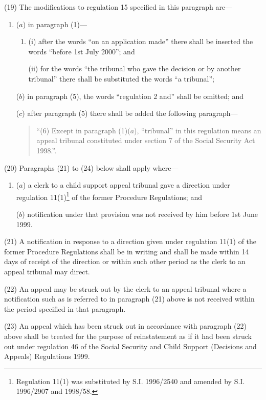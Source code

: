 \documentclass[12pt,a4paper]{article}
\begin{document}
(19) The modifications to regulation 15 specified in this paragraph are—
\begin{enumerate}\item[]
($a$) in paragraph (1)—
\begin{enumerate}\item[]
(i) after the words “on an application made” there shall be inserted the words “before 1st July 2000”; and

(ii) for the words “the tribunal who gave the decision or by another tribunal” there shall be substituted the words “a tribunal”;
\end{enumerate}

($b$) in paragraph (5), the words “regulation 2 and” shall be omitted; and

($c$) after paragraph (5) there shall be added the following paragraph—
\begin{quotation}
“(6) Except in paragraph (1)($a$), “tribunal” in this regulation means an appeal tribunal constituted under section 7 of the Social Security Act 1998.”.
\end{quotation}
\end{enumerate}

(20) Paragraphs (21) to (24) below shall apply where—
\begin{enumerate}\item[]
($a$) a clerk to a child support appeal tribunal gave a direction under regulation 11(1)\footnote{\frenchspacing Regulation 11(1) was substituted by S.I. 1996/2540 and amended by S.I. 1996/2907 and 1998/58.} of the former Procedure Regulations; and

($b$) notification under that provision was not received by him before 1st June 1999.
\end{enumerate}

(21) A notification in response to a direction given under regulation 11(1) of the former Procedure Regulations shall be in writing and shall be made within 14 days of receipt of the direction or within such other period as the clerk to an appeal tribunal may direct.

(22) An appeal may be struck out by the clerk to an appeal tribunal where a notification such as is referred to in paragraph (21) above is not received within the period specified in that paragraph.

(23) An appeal which has been struck out in accordance with paragraph (22) above shall be treated for the purpose of reinstatement as if it had been struck out under regulation 46 of the Social Security and Child Support (Decisions and Appeals) Regulations 1999.
\end{document}
